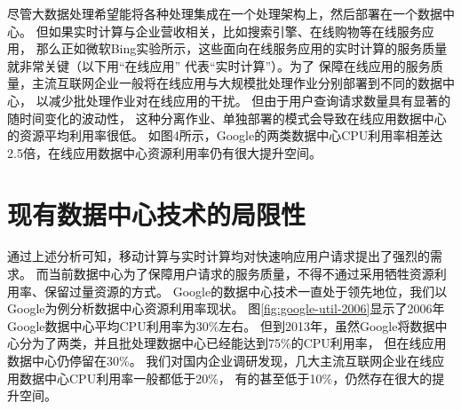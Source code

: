 尽管大数据处理希望能将各种处理集成在一个处理架构上，然后部署在一个数据中心。
但如果实时计算与企业营收相关，比如搜索引擎、在线购物等在线服务应用，
那么正如微软Bing实验所示，这些面向在线服务应用的实时计算的服务质量就非常关键（以下用“在线应用” 代表“实时计算”）。为了
保障在线应用的服务质量，主流互联网企业一般将在线应用与大规模批处理作业分别部署到不同的数据中心，
以减少批处理作业对在线应用的干扰。
但由于用户查询请求数量具有显著的随时间变化的波动性，
这种分离作业、单独部署的模式会导致在线应用数据中心的资源平均利用率很低。
如图4所示，Google的两类数据中心CPU利用率相差达2.5倍，在线应用数据中心资源利用率仍有很大提升空间。




\section{现有数据中心技术的局限性}

通过上述分析可知，移动计算与实时计算均对快速响应用户请求提出了强烈的需求。
而当前数据中心为了保障用户请求的服务质量，不得不通过采用牺牲资源利用率、保留过量资源的方式。
Google的数据中心技术一直处于领先地位，我们以Google为例分析数据中心资源利用率现状。
图\ref{fig:google-util-2006}显示了2006年Google数据中心平均CPU利用率为30\%左右。
但到2013年，虽然Google将数据中心分为了两类，并且批处理数据中心已经能达到75\%的CPU利用率，
但在线应用数据中心仍停留在30\%。
我们对国内企业调研发现，几大主流互联网企业在线应用数据中心CPU利用率一般都低于20\%，
有的甚至低于10\%，仍然存在很大的提升空间。

